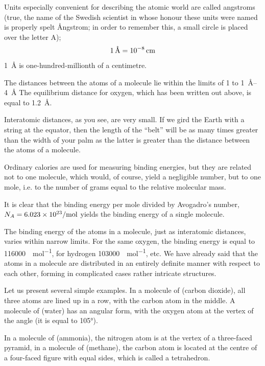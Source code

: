 Units especially convenient for describing the atomic world are called angstroms (true, the name of the Swedish scientist in whose honour these units were named is properly spelt \AA ngstrom; in order to remember this, a small circle is placed over the letter A);
\begin{equation*}%
\SI{1}{\angstrom} = \SI{d-8}{\centi\meter}
\end{equation*}
\SI{1}{\angstrom} is one-hundred-millionth of a centimetre.

The distances between the atoms of a molecule lie within the limits of 1 to \SIrange{1}{4}{\angstrom} The equilibrium distance for oxygen, which has been written out above, is equal to \SI{1.2}{\angstrom}.

Interatomic distances, as you see, are very small. If we gird the Earth with a string at the equator, then the length of the ``belt'' will be as many times greater than the width of your palm as the latter is greater than the distance between the atoms of a molecule.

Ordinary calories are used for measuring binding energies, but they are related not to one molecule, which would, of course, yield a negligible number, but to one mole, i.e. to the number of grams equal to the relative molecular mass.

It is clear that the binding energy per mole divided by Avogadro’s number, $N_{A} = \SI{6.023d23}{\per\mole}$ yields the binding energy of a single molecule.

The binding energy of the atoms in a molecule, just as interatomic distances, varies within narrow limits. For the same oxygen, the binding energy is equal to
\SI{116 000}{\calorie\per\mole}, for hydrogen \SI{103000}{\calorie\per\mole}, etc. We have already said that the atoms in a molecule are distributed in an entirely definite manner with respect to each other, forming in complicated cases rather intricate structures.

Let us present several simple examples. In a molecule
of  (carbon dioxide), all three atoms are lined up in a row, with the carbon atom in the middle. A molecule of  (water) has an angular form, with the oxygen atom at the vertex of the angle (it is equal to \ang{105}).

In a molecule of  (ammonia), the nitrogen atom
is at the vertex of a three-faced pyramid, in a molecule of  (methane), the carbon atom is located at the centre of a four-faced figure with equal sides, which is called a tetrahedron.

